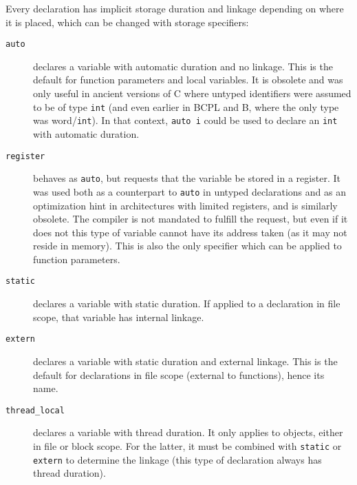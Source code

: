 Every declaration has implicit storage duration and linkage depending on where
it is placed, which can be changed with storage specifiers:

\begin{description}
    \item[\texttt{auto}]
        declares a variable with automatic duration and no linkage.  This is the
        default for function parameters and local variables.  It is obsolete and
        was only useful in ancient versions of C where untyped identifiers were
        assumed to be of type \texttt{int} (and even earlier in BCPL and B,
        where the only type was word/\texttt{int}\footnotemark).  In that
        context, \texttt{auto i} could be used to declare an \texttt{int} with
        automatic duration.
    \item[\texttt{register}]
        behaves as \texttt{auto}, but requests that the variable be stored in a
        register.  It was used both as a counterpart to \texttt{auto} in untyped
        declarations and as an optimization hint in architectures with limited
        registers, and is similarly obsolete.  The compiler is not mandated to
        fulfill the request, but even if it does not this type of variable
        cannot have its address taken (as it may not reside in memory).  This is
        also the only specifier which can be applied to function parameters.
    \item[\texttt{static}]
        declares a variable with static duration.  If applied to a declaration
        in file scope, that variable has internal linkage.
    \item[\texttt{extern}]
        declares a variable with static duration and external linkage.  This is
        the default for declarations in file scope (external to functions),
        hence its name.
    \item[\texttt{thread\_local}]
        declares a variable with thread duration\footnotemark.  It only applies
        to objects, either in file or block scope.  For the latter, it must be
        combined with \texttt{static} or \texttt{extern} to determine the
        linkage (this type of declaration always has thread duration).
\end{description}

